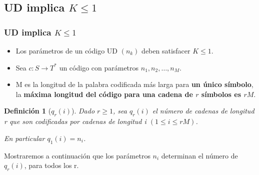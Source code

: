 \documentclass{beamer}
\newtheorem{definicion} [Definicion]{Definición}
\begin{document}
\subsection{UD implica $K \leq 1$}
\begin{frame}    \frametitle{UD implica $K \leq 1$}     \small
 
\begin{itemize}
\item Los parámetros de un código UD  $(n_k)$ deben satisfacer $K \leq 1$.  

\item Sea $c: S\rightarrow T^{*}$ un código con parámetros $n_{1}, n_{2}, \ldots, n_{M}$. 

\item M es la longitud de la palabra codificada más larga para \textbf{un único símbolo}, la \textbf{máxima longitud del código para una cadena de $r$ símbolos es $rM$}.

 
\end{itemize}

\begin{definicion} [$q_{r}(i)$]\label{qr}
Dado $r \geq 1$, sea $q_{r}(i)$ el número de cadenas de longitud r que son codificadas por cadenas de longitud i $(1\leq i \leq rM)$. 

En particular $q_{1}(i)=n_{i}$. 
\end{definicion} 
 Mostraremos a continuación que los parámetros $n_{i}$ determinan el número de $q_{r}(i)$, para todos los r.

\end{frame}

\end{document}
